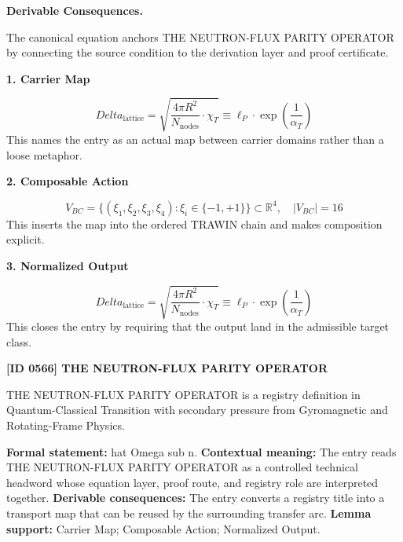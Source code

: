 \par\vspace{0.35em}
\noindent\textbf{Derivable Consequences.}\quad
\begingroup
\footnotesize
\raggedright
The canonical equation anchors THE NEUTRON-FLUX PARITY OPERATOR by connecting the source condition to the derivation layer and proof certificate.
\par\endgroup

\noindent\textbf{1. Carrier Map}\par
\[
Delta_{\text{lattice}} = \sqrt{\frac{4\pi R^2}{N_{\text{nodes}}} \cdot \chi_T} \equiv \ell_P \cdot \exp\left( \frac{1}{\alpha_T} \right)
\]
\noindent This names the entry as an actual map between carrier domains rather than a loose metaphor.\par
\noindent\textbf{2. Composable Action}\par
\[
V_{BC} = \{ (\xi_1, \xi_2, \xi_3, \xi_4) : \xi_i \in \{ -1, +1 \} \} \subset \mathbb{R}^4, \quad |V_{BC}| = 16
\]
\noindent This inserts the map into the ordered TRAWIN chain and makes composition explicit.\par
\noindent\textbf{3. Normalized Output}\par
\[
Delta_{\text{lattice}} = \sqrt{\frac{4\pi R^2}{N_{\text{nodes}}} \cdot \chi_T} \equiv \ell_P \cdot \exp\left( \frac{1}{\alpha_T} \right)
\]
\noindent This closes the entry by requiring that the output land in the admissible target class.\par

\clearpage
\noindent\textbf{[ID 0566] THE NEUTRON-FLUX PARITY OPERATOR}\par
\vspace{0.35em}
\begingroup\small
{}
THE NEUTRON-FLUX PARITY OPERATOR is a registry definition in Quantum-Classical Transition with secondary pressure from Gyromagnetic and Rotating-Frame Physics.

\begingroup\footnotesize\setlength{\emergencystretch}{3em}\sloppy
\textbf{Formal statement:} hat Omega sub n. \textbf{Contextual meaning:} The entry reads THE NEUTRON-FLUX PARITY OPERATOR as a controlled technical headword whose equation layer, proof route, and registry role are interpreted together. \textbf{Derivable consequences:} The entry converts a registry title into a transport map that can be reused by the surrounding transfer arc. \textbf{Lemma support:} Carrier Map; Composable Action; Normalized Output.\par
\endgroup

